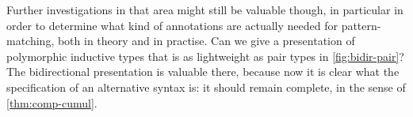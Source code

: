 Further investigations in that area might still be valuable though, in particular in order
to determine what kind of annotations are actually needed for pattern-matching, both
in theory and in practise. Can we give a presentation of polymorphic inductive types
that is as lightweight as pair types in \cref{fig:bidir-pair}?
The bidirectional presentation is valuable there, because now
it is clear what the specification of an alternative syntax is:
it should remain complete, in the sense of \cref{thm:comp-cumul}.